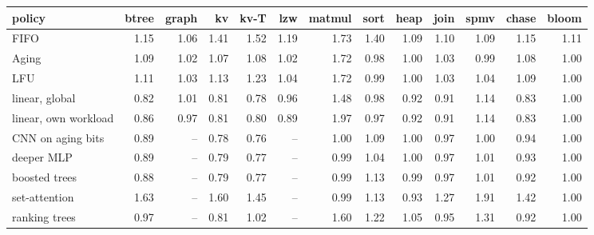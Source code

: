 \begin{tabular}{lrrrrrrrrrrrr}
\toprule
policy & btree & graph & kv & kv-T & lzw & matmul & sort & heap & join & spmv & chase & bloom \\
\midrule
FIFO & 1.15 & 1.06 & 1.41 & 1.52 & 1.19 & 1.73 & 1.40 & 1.09 & 1.10 & 1.09 & 1.15 & 1.11 \\
Aging & 1.09 & 1.02 & 1.07 & 1.08 & 1.02 & 1.72 & 0.98 & 1.00 & 1.03 & 0.99 & 1.08 & 1.00 \\
LFU & 1.11 & 1.03 & 1.13 & 1.23 & 1.04 & 1.72 & 0.99 & 1.00 & 1.03 & 1.04 & 1.09 & 1.00 \\
linear, global & 0.82 & 1.01 & 0.81 & 0.78 & 0.96 & 1.48 & 0.98 & 0.92 & 0.91 & 1.14 & 0.83 & 1.00 \\
linear, own workload & 0.86 & 0.97 & 0.81 & 0.80 & 0.89 & 1.97 & 0.97 & 0.92 & 0.91 & 1.14 & 0.83 & 1.00 \\
CNN on aging bits & 0.89 & -- & 0.78 & 0.76 & -- & 1.00 & 1.09 & 1.00 & 0.97 & 1.00 & 0.94 & 1.00 \\
deeper MLP & 0.89 & -- & 0.79 & 0.77 & -- & 0.99 & 1.04 & 1.00 & 0.97 & 1.01 & 0.93 & 1.00 \\
boosted trees & 0.88 & -- & 0.79 & 0.77 & -- & 0.99 & 1.13 & 0.99 & 0.97 & 1.01 & 0.92 & 1.00 \\
set-attention & 1.63 & -- & 1.60 & 1.45 & -- & 0.99 & 1.13 & 0.93 & 1.27 & 1.91 & 1.42 & 1.00 \\
ranking trees & 0.97 & -- & 0.81 & 1.02 & -- & 1.60 & 1.22 & 1.05 & 0.95 & 1.31 & 0.92 & 1.00 \\
\bottomrule
\end{tabular}
